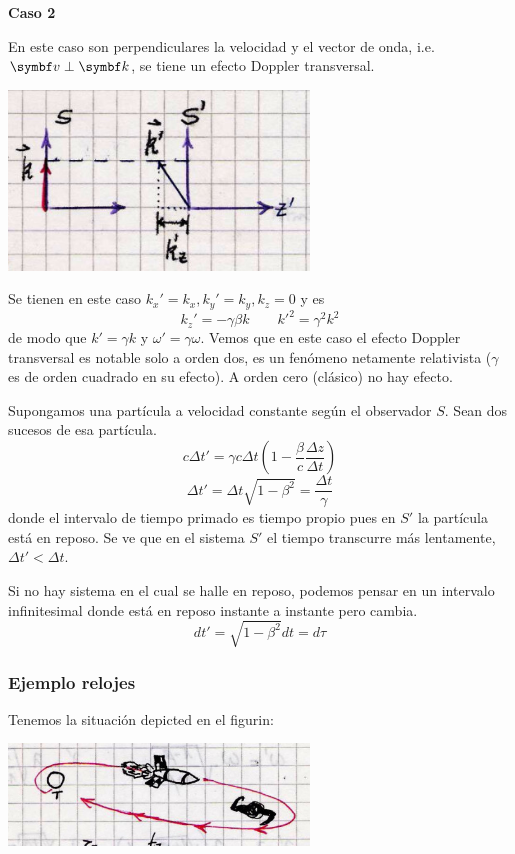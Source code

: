 \documentclass[10pt,oneside]{CBFT_book}
\begin{document}
{\bf Caso 2}

En este caso son perpendiculares la velocidad y el vector de onda, i.e. $\vb{v} \perp \vb{k}$,
se tiene un efecto Doppler transversal.

\includegraphics[width=0.6\textwidth]{images/fig_ft1_sperel_doppler2.jpg}

Se tienen en este caso $k_x' = k_x,  k_y'= k_y , k_z = 0 $ y es
\[
	k_z'= - \gamma \beta k  \qquad 
	{k'}^2= \gamma^2 k^2
\]
de modo que $ k' = \gamma k $ y $ \omega' = \gamma \omega $.
Vemos que en este caso el efecto Doppler transversal es notable solo a orden dos, es un fenómeno
netamente relativista ($\gamma$ es de orden cuadrado en su efecto). A orden cero (clásico) no hay
efecto.

Supongamos una partícula a velocidad constante según el observador $S$. Sean dos sucesos de esa
partícula.
\[
	c \Delta t' =  \gamma c \Delta t \left( 1 - \frac{\beta}{c} \frac{\Delta z}{\Delta t} \right)
\]
\[
	\Delta t' = \Delta t \sqrt{1 - \beta^2} = \frac{\Delta t}{\gamma}
\]
donde el intervalo de tiempo primado es tiempo propio pues en $S'$ la partícula está en reposo.
Se ve que en el sistema $S'$ el tiempo transcurre más lentamente, $ \Delta t' < \Delta t $.

Si no hay sistema en el cual se halle en reposo, podemos pensar en un intervalo infinitesimal
donde está en reposo instante a instante pero cambia.
\[
	dt'=  \sqrt{ 1 - \beta^2 } dt = d\tau
\]

\subsubsection{Ejemplo relojes}

Tenemos la situación depicted en el figurin:

\includegraphics[width=0.6\textwidth]{images/fig_ft1_sperel_mellizos.jpg}
\end{document}
